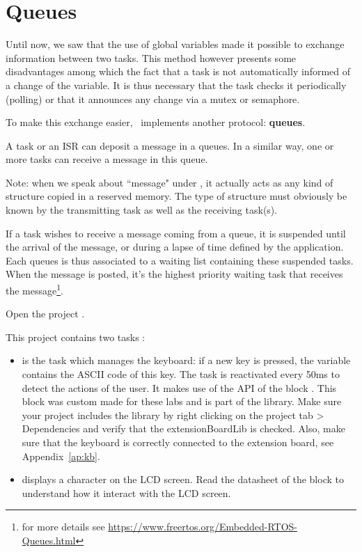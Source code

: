 \section{Queues}

Until now, we saw that the use of global variables made it possible to exchange information between two tasks. This method however presents some disadvantages among which the fact that a task is not automatically informed of a change of the variable. It is thus necessary that the task checks it periodically (polling) or that it announces any change via a mutex or semaphore.

To make this exchange easier, \rtos~implements another protocol: \textbf{queues}.

A task or an ISR can deposit a message in a queues. In a similar way, one or more tasks can receive a message in this queue.

Note: when we speak about ``message" under \rtos, it actually acts as any kind of structure copied in a reserved memory. The type of structure must obviously be known by the transmitting task as well as the receiving task(s).


If a task wishes to receive a message coming from a queue, it is suspended until the arrival of the message, or during a lapse of time defined by the application. Each queues is thus associated to a waiting list containing these suspended tasks. When the message is posted, it's the highest priority waiting task that receives the message\footnote{for more details see
\url{https://www.freertos.org/Embedded-RTOS-Queues.html}}.

Open the project .
 
This project contains two tasks :
\begin{itemize}
    \item {} is the task which manages the keyboard: if a new key is pressed, the  variable contains the ASCII code of this key. The task is reactivated every 50ms to detect the actions of the user. It makes use of the  API of the block . This block was custom made for these labs and is part of the  library. Make sure your project includes the library by right clicking on the project tab > Dependencies and verify that the extensionBoardLib is checked. Also, make sure that the keyboard is correctly connected to the extension board, see Appendix~\ref{ap:kb}.
    \item {} displays a character on the LCD screen. Read the datasheet of the  block to understand how it interact with the LCD screen.
\end{itemize}


